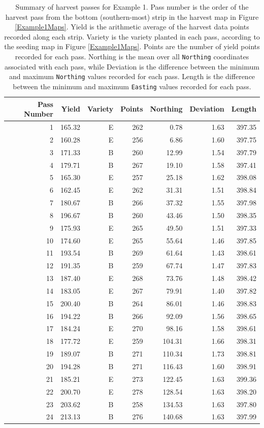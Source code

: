 \documentclass[phdcss]{SDSUThesis}
\begin{document}
\begin{table}[h!]
\centering
\begin{tabular}{r r r r r r r} 
 \hline
 Pass Number & Yield & Variety & Points & Northing & Deviation & Length\\ 
 \hline
 1 & 165.32 & E & 262 &   0.78 & 1.63 & 397.35 \\
 2 & 160.28 & E & 256 &   6.86 & 1.60 & 397.75 \\
 3 & 171.33 & B & 260 &  12.99 & 1.54 & 397.79 \\
 4 & 179.71 & B & 267 &  19.10 & 1.58 & 397.41 \\
 5 & 165.30 & E & 257 &  25.18 & 1.62 & 398.08 \\
 6 & 162.45 & E & 262 &  31.31 & 1.51 & 398.84 \\
 7 & 180.67 & B & 266 &  37.32 & 1.55 & 397.98 \\
 8 & 196.67 & B & 260 &  43.46 & 1.50 & 398.35 \\
 9 & 175.93 & E & 265 &  49.50 & 1.51 & 397.33 \\
10 & 174.60 & E & 265 &  55.64 & 1.46 & 397.85 \\
11 & 193.54 & B & 269 &  61.64 & 1.43 & 398.61 \\
12 & 191.35 & B & 259 &  67.74 & 1.47 & 397.83 \\
13 & 187.40 & E & 268 &  73.76 & 1.48 & 398.42 \\
14 & 183.05 & E & 267 &  79.91 & 1.40 & 397.82 \\
15 & 200.40 & B & 264 &  86.01 & 1.46 & 398.83 \\
16 & 194.22 & B & 266 &  92.09 & 1.56 & 398.65 \\
17 & 184.24 & E & 270 &  98.16 & 1.58 & 398.61 \\
18 & 177.72 & E & 259 & 104.31 & 1.66 & 398.31 \\
19 & 189.07 & B & 271 & 110.34 & 1.73 & 398.81 \\
20 & 194.28 & B & 271 & 116.43 & 1.60 & 398.91 \\
21 & 185.21 & E & 273 & 122.45 & 1.63 & 399.36 \\
22 & 200.70 & E & 278 & 128.54 & 1.63 & 398.20 \\
23 & 203.62 & B & 258 & 134.53 & 1.63 & 397.80 \\
24 & 213.13 & B & 276 & 140.68 & 1.63 & 397.99 \\
\end{tabular}
\caption{Summary of harvest passes for Example 1. Pass number is the order of the harvest pass from the bottom (southern-most) strip in the harvest map in Figure \ref{Example1Maps}. Yield is the arithmetic average of the harvest data points recorded along each strip. Variety is the variety planted in each pass, according to the seeding map in Figure \ref{Example1Maps}. Points are the number of yield points recorded for each pass. Northing is the mean over all \texttt{Northing} coordinates associated with each pass, while Deviation is the difference between the minimum and maximum \texttt{Northing} values recorded for each pass. Length is the difference between the minimum and maximum \texttt{Easting} values recorded for each pass.}
\label{SummaryExample1Passes}
\end{table}
\end{document}
